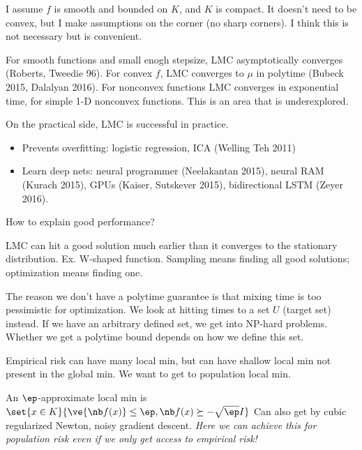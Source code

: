 
I assume $f$ is smooth and bounded on $K$, and $K$ is compact. It doesn't need to be convex, but I make assumptions on the corner (no sharp corners). I think this is not necessary but is convenient.

For smooth functions and small enogh stepsize, LMC asymptotically converges (Roberts, Tweedie 96). 
For convex $f$, LMC converges to $\mu$ in polytime (Bubeck 2015, Dalalyan 2016).
For nonconvex functions LMC converges in exponential time, for simple 1-D nonconvex functions.
This is an area that is underexplored.

On the practical side, LMC is successful in practice.
\begin{itemize}
\item
Prevents overfitting: logistic regression, ICA (Welling Teh 2011)
\item
Learn deep nets:  neural programmer (Neelakantan 2015), neural RAM (Kurach 2015), GPUs (Kaiser, Sutskever 2015), bidirectional LSTM (Zeyer 2016).
\end{itemize}
How to explain good performance?


LMC can hit a good solution much earlier than it converges to the stationary distribution. Ex. W-shaped function. Sampling means finding all good solutions; optimization means finding one.


The reason we don't have a polytime guarantee is that mixing time is too pessimistic for optimization. We look at hitting times  to a set $U$ (target set) instead. If we have an arbitrary defined set, we get into NP-hard problems. Whether we get a polytime bound depends on how we define this set.


Empirical risk can have many local min, but can have shallow local min not present in the global min. We want to get to population local min.

An $\ep$-approximate local min is $\set{x\in K}{\ve{\nb f(x)}\le \ep, \nb f(x) \succeq -\sqrt{\ep}I}$
Can also get by cubic regularized Newton, noisy gradient descent. \emph{Here we can achieve this for population risk even if we only get access to empirical risk!}


